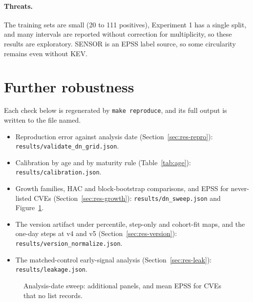 \paragraph{Threats.} The training sets are small (20 to 111 positives),
Experiment 1 has a single split, and many intervals are reported without
correction for multiplicity, so these results are exploratory. SENSOR is an
EPSS label source, so some circularity remains even without KEV.

\section{Further robustness}\label{app:robust}

Each check below is regenerated by \texttt{make reproduce}, and its full
output is written to the file named.
\begin{itemize}
\item Reproduction error against analysis date (Section~\ref{sec:res-repro}):
\texttt{results/validate\_dn\_grid.json}.
\item Calibration by age and by maturity rule (Table~\ref{tab:age}):
\texttt{results/calibration.json}.
\item Growth families, HAC and block-bootstrap comparisons, and EPSS for
never-listed CVEs (Section~\ref{sec:res-growth}): \texttt{results/dn\_sweep.json}
and Figure~\ref{fig:sweepapp}.
\item The version artifact under percentile, step-only and cohort-fit maps,
and the one-day steps at v4 and v5 (Section~\ref{sec:res-version}):
\texttt{results/version\_normalize.json}.
\item The matched-control early-signal analysis (Section~\ref{sec:res-leak}):
\texttt{results/leakage.json}.
\end{itemize}

\begin{figure}[tb]
\centering
{}
\caption{Analysis-date sweep: additional panels, and mean EPSS for CVEs that
no list records.}\label{fig:sweepapp}
\end{figure}
